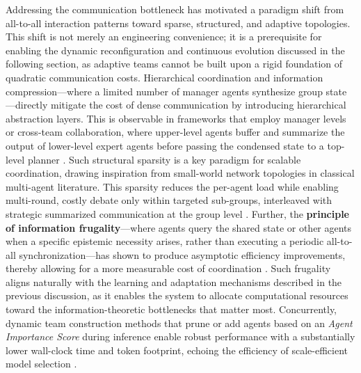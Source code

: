 \documentclass[11pt,a4paper]{article}
\begin{document}
Addressing the communication bottleneck has motivated a paradigm shift from all-to-all interaction patterns toward sparse, structured, and adaptive topologies. This shift is not merely an engineering convenience; it is a prerequisite for enabling the dynamic reconfiguration and continuous evolution discussed in the following section, as adaptive teams cannot be built upon a rigid foundation of quadratic communication costs. Hierarchical coordination and information compression---where a limited number of manager agents synthesize group state---directly mitigate the cost of dense communication by introducing hierarchical abstraction layers. This is observable in frameworks that employ manager levels or cross-team collaboration, where upper-level agents buffer and summarize the output of lower-level expert agents before passing the condensed state to a top-level planner \cite{arxiv:2308.10848v3,arxiv:2406.08979v1}. Such structural sparsity is a key paradigm for scalable coordination, drawing inspiration from small-world network topologies in classical multi-agent literature. This sparsity reduces the per-agent load while enabling multi-round, costly debate only within targeted sub-groups, interleaved with strategic summarized communication at the group level \cite{arxiv:2310.02124v2}. Further, the \textbf{principle of information frugality}---where agents query the shared state or other agents when a specific epistemic necessity arises, rather than executing a periodic all-to-all synchronization---has shown to produce asymptotic efficiency improvements, thereby allowing for a more measurable cost of coordination \cite{arxiv:2309.13193v1}. Such frugality aligns naturally with the learning and adaptation mechanisms described in the previous discussion, as it enables the system to allocate computational resources toward the information-theoretic bottlenecks that matter most. Concurrently, dynamic team construction methods that prune or add agents based on an \emph{Agent Importance Score} during inference enable robust performance with a substantially lower wall-clock time and token footprint, echoing the efficiency of scale-efficient model selection \cite{arxiv:2310.02170v1}.
\end{document}
